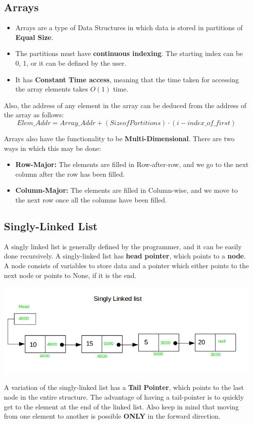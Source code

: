 \documentclass{article}
\theoremstyle{definition}
\theoremstyle{example}
\begin{document}
\subsection{\Large Arrays}
\begin{itemize}
    \item Arrays are a type of Data Structures in which data is stored in partitions of \textbf{Equal Size}.
    \item The partitions must have \textbf{continuous indexing}. The starting index can be 0, 1, or it can be defined by the user.
    \item It has \textbf{Constant Time access}, meaning that the time taken for accessing the array elements takes $O(1)$ time.
\end{itemize}
Also, the address of any element in the array can be deduced from the address of the array as follows:
\[Elem\_Addr = Array\_Addr + (Size of Partitions)\cdot (i - index\_of\_first)\]\par
\vspace{8mm}
Arrays also have the functionality to be \textbf{Multi-Dimensional}. There are two ways in which this may be done:
\begin{itemize}
    \item \textbf{Row-Major: }The elements are filled in Row-after-row, and we go to the next column after the row has been filled.
    \item \textbf{Column-Major: }The elements are filled in Column-wise, and we move to the next row once all the columns have been filled.
\end{itemize}

\subsection{\Large Singly-Linked List}
\hspace{4mm} A singly linked list is generally defined by the programmer, and it can be easily done recursively. A singly-linked list has \textbf{head pointer}, which points to a \textbf{node}. A node consists of variables to store data and a pointer which either points to the next node or points to None, if it is the end.\par
\vspace{2mm}
\includegraphics[scale = 0.75]{sll.png}\par
\vspace{2mm}
A variation of the singly-linked list has a \textbf{Tail Pointer}, which points to the last node in the entire structure. The advantage of having a tail-pointer is to quickly get to the element at the end of the linked list. Also keep in mind that moving from one element to another is possible \textbf{ONLY} in the forward direction.\par
\newpage
\end{document}
